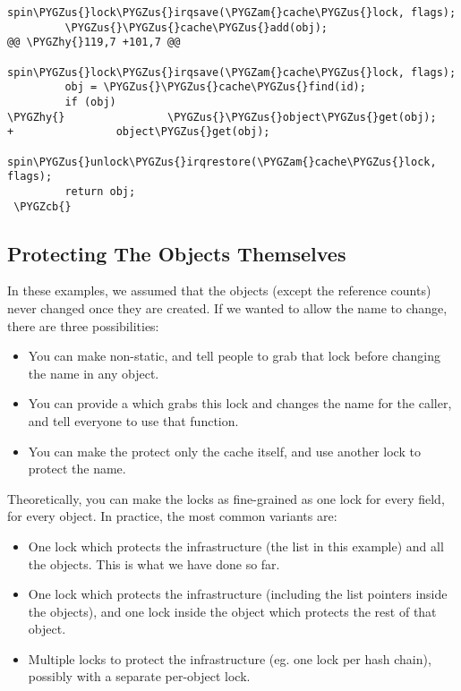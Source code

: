 \documentclass[a4paper,8pt,english]{sphinxmanual}
\def\PYGZus{\char`\_}
\def\PYGZcb{\char`\}}
\def\PYGZam{\char`\&}
\def\PYGZhy{\char`\-}
\begin{document}
\begin{Verbatim}[commandchars=\\\{\}]
         spin\PYGZus{}lock\PYGZus{}irqsave(\PYGZam{}cache\PYGZus{}lock, flags);
         \PYGZus{}\PYGZus{}cache\PYGZus{}add(obj);
@@ \PYGZhy{}119,7 +101,7 @@
         spin\PYGZus{}lock\PYGZus{}irqsave(\PYGZam{}cache\PYGZus{}lock, flags);
         obj = \PYGZus{}\PYGZus{}cache\PYGZus{}find(id);
         if (obj)
\PYGZhy{}                \PYGZus{}\PYGZus{}object\PYGZus{}get(obj);
+                object\PYGZus{}get(obj);
         spin\PYGZus{}unlock\PYGZus{}irqrestore(\PYGZam{}cache\PYGZus{}lock, flags);
         return obj;
 \PYGZcb{}
\end{Verbatim}


\subsection{Protecting The Objects Themselves}
\label{kernel-hacking/locking:protecting-the-objects-themselves}
In these examples, we assumed that the objects (except the reference
counts) never changed once they are created. If we wanted to allow the
name to change, there are three possibilities:
\begin{itemize}
\item {} 
You can make  non-static, and tell people to grab that
lock before changing the name in any object.

\item {} 
You can provide a  which grabs this
lock and changes the name for the caller, and tell everyone to use
that function.

\item {} 
You can make the  protect only the cache itself, and
use another lock to protect the name.

\end{itemize}

Theoretically, you can make the locks as fine-grained as one lock for
every field, for every object. In practice, the most common variants
are:
\begin{itemize}
\item {} 
One lock which protects the infrastructure (the  list in
this example) and all the objects. This is what we have done so far.

\item {} 
One lock which protects the infrastructure (including the list
pointers inside the objects), and one lock inside the object which
protects the rest of that object.

\item {} 
Multiple locks to protect the infrastructure (eg. one lock per hash
chain), possibly with a separate per-object lock.

\end{itemize}
\end{document}
